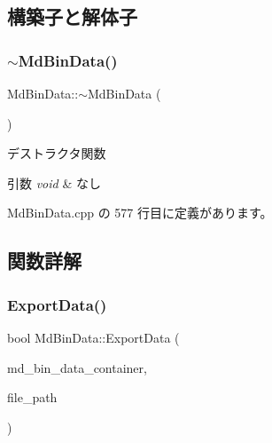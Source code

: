 \subsection{構築子と解体子}
\mbox{\label{class_md_bin_data_a8a2fe0ddd94c58c37e513f19b94c044f}} 
\subsubsection{\texorpdfstring{$\sim$\+Md\+Bin\+Data()}{~MdBinData()}}
{\footnotesize\ttfamily Md\+Bin\+Data\+::$\sim$\+Md\+Bin\+Data (\begin{DoxyParamCaption}{ }\end{DoxyParamCaption})}



デストラクタ関数 


\begin{DoxyParams}{引数}
{\em void} & なし \\
\hline
\end{DoxyParams}


 Md\+Bin\+Data.\+cpp の 577 行目に定義があります。



\subsection{関数詳解}
\mbox{\label{class_md_bin_data_aa9e3d4f176e966533640206296a222cd}} 
\subsubsection{\texorpdfstring{Export\+Data()}{ExportData()}}
{\footnotesize\ttfamily bool Md\+Bin\+Data\+::\+Export\+Data (\begin{DoxyParamCaption}\item[{\mbox{\hyperlink{class_md_bin_data}{Md\+Bin\+Data}} $\ast$}]{md\+\_\+bin\+\_\+data\+\_\+container,  }\item[{std\+::string}]{file\+\_\+path }\end{DoxyParamCaption})\hspace{0.3cm}{\ttfamily [static]}}



